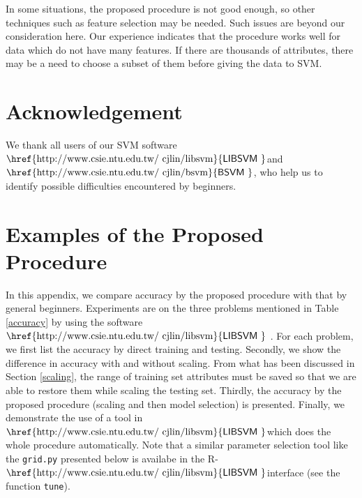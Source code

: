 \documentclass[12pt]{article}
\newcommand{\libsvm}{$\mbox{\href{http://www.csie.ntu.edu.tw/~cjlin/libsvm}{\sf LIBSVM }}$}
\newcommand{\bsvm}{$\mbox{\href{http://www.csie.ntu.edu.tw/~cjlin/bsvm}{\sf BSVM }}$}
\begin{document}
In some situations, the proposed procedure is not good
enough, so other techniques such as feature selection may
be needed. Such issues are beyond our consideration
here. Our experience indicates that the
procedure works well for data which do not
have many features. 
If there are thousands of
attributes, there may be a need to choose a 
subset of them before giving the data to SVM.

\section*{Acknowledgement}
We thank all users of our SVM software
\libsvm and \bsvm, who help us to identify
possible difficulties encountered by beginners.

\appendix

\section{Examples of the Proposed Procedure}
\label{app}

In this appendix, we compare accuracy
by the proposed procedure with that by general beginners.
Experiments are on the three problems mentioned in
Table \ref{accuracy} by using the software \libsvm
\cite{CC01a}. For each problem, we first list the
accuracy by direct training and testing. Secondly, we show 
the difference in accuracy with and without scaling.
From what has been discussed in Section \ref{scaling},
the range of training set attributes must 
be saved so that we are able to restore them while
scaling the testing set.
Thirdly, the accuracy by the proposed procedure (scaling 
and then model selection) is presented. Finally, we demonstrate 
the use of a tool in \libsvm which does 
the whole procedure automatically. Note that a similar 
parameter selection tool like the {\tt grid.py} presented below
is availabe in the R-\libsvm interface
(see the function {\tt tune}).
\end{document}
